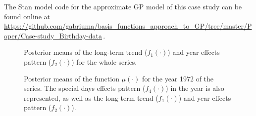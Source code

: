 \documentclass[onecolumn,a4paper,11pt]{article}
\begin{document}
The Stan model code for the approximate GP model of this case study can be found online at {\small \url{https://github.com/gabriuma/basis_functions_approach_to_GP/tree/master/Paper/Case-study_Birthday-data}}\,.

\begin{figure}
\centering
{}
\caption{Posterior means of the long-term trend ($f_1(\cdot)$) and year effects pattern ($f_2(\cdot)$) for the whole series. }
  \label{ch5_fig27_posteriors_birthday}
\end{figure}

\begin{figure}
\centering
{}
\caption{Posterior means of the function $\mu(\cdot)$ for the year 1972 of the series. The special days effects pattern ($f_4(\cdot)$) in the year is also represented, as well as the long-term trend ($f_1(\cdot)$) and year effects pattern ($f_2(\cdot)$). }
  \label{ch5_fig27_posteriors_oneyear_birthday}
\end{figure}
\end{document}
